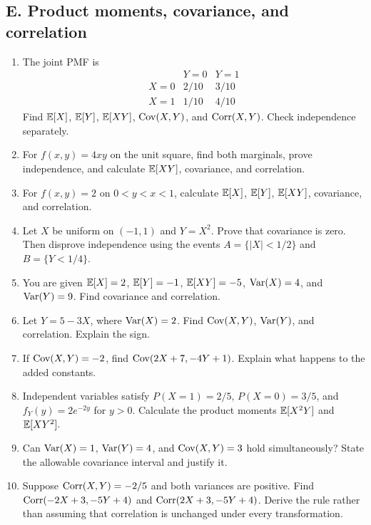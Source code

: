 \subsection{E. Product moments, covariance, and correlation}
\begin{enumerate}[label=\textbf{E\arabic*.},leftmargin=*,itemsep=0.75em]
\item The joint PMF is
\[
\begin{array}{c|cc}
 &Y=0&Y=1\\\hline
X=0&2/10&3/10\\
X=1&1/10&4/10
\end{array}
\]
Find $\mathbb E[X]$, $\mathbb E[Y]$, $\mathbb E[XY]$, $\operatorname{Cov}(X,Y)$, and $\operatorname{Corr}(X,Y)$. Check independence separately.
\item For $f(x,y)=4xy$ on the unit square, find both marginals, prove independence, and calculate $\mathbb E[XY]$, covariance, and correlation.
\item For $f(x,y)=2$ on $0<y<x<1$, calculate $\mathbb E[X]$, $\mathbb E[Y]$, $\mathbb E[XY]$, covariance, and correlation.
\item Let $X$ be uniform on $(-1,1)$ and $Y=X^2$. Prove that covariance is zero. Then disprove independence using the events $A=\{|X|<1/2\}$ and $B=\{Y<1/4\}$.
\item You are given $\mathbb E[X]=2$, $\mathbb E[Y]=-1$, $\mathbb E[XY]=-5$, $\operatorname{Var}(X)=4$, and $\operatorname{Var}(Y)=9$. Find covariance and correlation.
\item Let $Y=5-3X$, where $\operatorname{Var}(X)=2$. Find $\operatorname{Cov}(X,Y)$, $\operatorname{Var}(Y)$, and correlation. Explain the sign.
\item If $\operatorname{Cov}(X,Y)=-2$, find $\operatorname{Cov}(2X+7,-4Y+1)$. Explain what happens to the added constants.
\item Independent variables satisfy $P(X=1)=2/5$, $P(X=0)=3/5$, and $f_Y(y)=2e^{-2y}$ for $y>0$. Calculate the product moments $\mathbb E[X^2Y]$ and $\mathbb E[XY^2]$.
\item Can $\operatorname{Var}(X)=1$, $\operatorname{Var}(Y)=4$, and $\operatorname{Cov}(X,Y)=3$ hold simultaneously? State the allowable covariance interval and justify it.
\item Suppose $\operatorname{Corr}(X,Y)=-2/5$ and both variances are positive. Find $\operatorname{Corr}(-2X+3,-5Y+4)$ and $\operatorname{Corr}(2X+3,-5Y+4)$. Derive the rule rather than assuming that correlation is unchanged under every transformation.
\end{enumerate}

